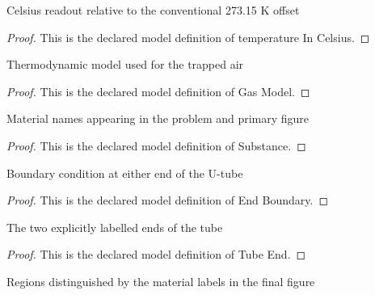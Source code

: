 \begin{definition}
  \label{def:physics:phyx-mini-0366:phyxminiproblems-problemphyxmini0366-temperatureincelsius}
  Celsius readout relative to the conventional 273.15 K offset
\end{definition}
\begin{proof}
  This is the declared model definition of temperature In Celsius.
\end{proof}
\begin{definition}
  \label{def:physics:phyx-mini-0366:phyxminiproblems-problemphyxmini0366-gasmodel}
  Thermodynamic model used for the trapped air
\end{definition}
\begin{proof}
  This is the declared model definition of Gas Model.
\end{proof}
\begin{definition}[Substance]
  \label{def:physics:phyx-mini-0366:phyxminiproblems-problemphyxmini0366-substance}
  Material names appearing in the problem and primary figure
\end{definition}
\begin{proof}
  This is the declared model definition of Substance.
\end{proof}
\begin{definition}
  \label{def:physics:phyx-mini-0366:phyxminiproblems-problemphyxmini0366-endboundary}
  Boundary condition at either end of the U-tube
\end{definition}
\begin{proof}
  This is the declared model definition of End Boundary.
\end{proof}
\begin{definition}
  \label{def:physics:phyx-mini-0366:phyxminiproblems-problemphyxmini0366-tubeend}
  The two explicitly labelled ends of the tube
\end{definition}
\begin{proof}
  This is the declared model definition of Tube End.
\end{proof}
\begin{definition}
  \label{def:physics:phyx-mini-0366:phyxminiproblems-problemphyxmini0366-figureregion}
  Regions distinguished by the material labels in the final figure
\end{definition}
